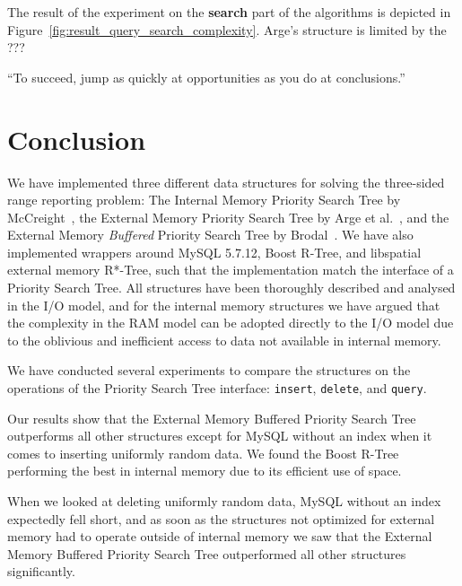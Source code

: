\documentclass[twoside,11pt,openright]{report}
\begin{document}

The result of the experiment on the \textbf{search} part of the algorithms is depicted in Figure~\ref{fig:result_query_search_complexity}. Arge's structure is limited by the ???

\begin{savequote}[0.45\textwidth]
``To succeed, jump as quickly at opportunities as you do at conclusions.''
\end{savequote}
\chapter{Conclusion}
\label{chp:conclusion}

We have implemented three different data structures for solving the three-sided range reporting problem: The Internal Memory Priority Search Tree by McCreight~\cite{DBLP:journals/siamcomp/McCreight85}, the External Memory Priority Search Tree by Arge et al.~\cite{arge_samoladas_vitter_1999}, and the External Memory \textit{Buffered} Priority Search Tree by Brodal~\cite{DBLP:journals/corr/Brodal15}. We have also implemented wrappers around MySQL 5.7.12, Boost R-Tree, and libspatial external memory R*-Tree, such that the implementation match the interface of a Priority Search Tree. All structures have been thoroughly described and analysed in the I/O model, and for the internal memory structures we have argued that the complexity in the RAM model can be adopted directly to the I/O model due to the oblivious and inefficient access to data not available in internal memory.

We have conducted several experiments to compare the structures on the operations of the Priority Search Tree interface: \texttt{insert}, \texttt{delete}, and \texttt{query}.

Our results show that the External Memory Buffered Priority Search Tree outperforms all other structures except for MySQL without an index when it comes to inserting uniformly random data. We found the Boost R-Tree performing the best in internal memory due to its efficient use of space.

When we looked at deleting uniformly random data, MySQL without an index expectedly fell short, and as soon as the structures not optimized for external memory had to operate outside of internal memory we saw that the External Memory Buffered Priority Search Tree outperformed all other structures significantly.
\end{document}
